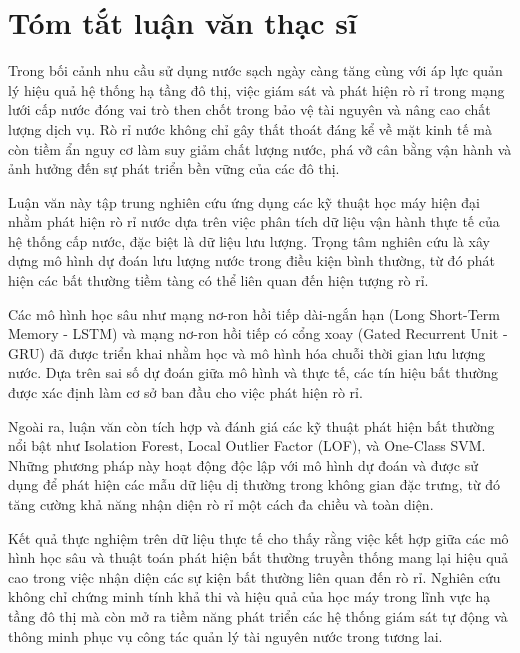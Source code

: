 \chapter*{Tóm tắt luận văn thạc sĩ}

Trong bối cảnh nhu cầu sử dụng nước sạch ngày càng tăng cùng với áp lực quản lý hiệu quả hệ thống hạ tầng đô thị, việc giám sát và phát hiện rò rỉ trong mạng lưới cấp nước đóng vai trò then chốt trong bảo vệ tài nguyên và nâng cao chất lượng dịch vụ. Rò rỉ nước không chỉ gây thất thoát đáng kể về mặt kinh tế mà còn tiềm ẩn nguy cơ làm suy giảm chất lượng nước, phá vỡ cân bằng vận hành và ảnh hưởng đến sự phát triển bền vững của các đô thị.

Luận văn này tập trung nghiên cứu ứng dụng các kỹ thuật học máy hiện đại nhằm phát hiện rò rỉ nước dựa trên việc phân tích dữ liệu vận hành thực tế của hệ thống cấp nước, đặc biệt là dữ liệu lưu lượng. Trọng tâm nghiên cứu là xây dựng mô hình dự đoán lưu lượng nước trong điều kiện bình thường, từ đó phát hiện các bất thường tiềm tàng có thể liên quan đến hiện tượng rò rỉ.

Các mô hình học sâu như mạng nơ-ron hồi tiếp dài-ngắn hạn (Long Short-Term Memory - LSTM) và mạng nơ-ron hồi tiếp có cổng xoay (Gated Recurrent Unit - GRU) đã được triển khai nhằm học và mô hình hóa chuỗi thời gian lưu lượng nước. Dựa trên sai số dự đoán giữa mô hình và thực tế, các tín hiệu bất thường được xác định làm cơ sở ban đầu cho việc phát hiện rò rỉ.

Ngoài ra, luận văn còn tích hợp và đánh giá các kỹ thuật phát hiện bất thường nổi bật như Isolation Forest, Local Outlier Factor (LOF), và One-Class SVM. Những phương pháp này hoạt động độc lập với mô hình dự đoán và được sử dụng để phát hiện các mẫu dữ liệu dị thường trong không gian đặc trưng, từ đó tăng cường khả năng nhận diện rò rỉ một cách đa chiều và toàn diện.

Kết quả thực nghiệm trên dữ liệu thực tế cho thấy rằng việc kết hợp giữa các mô hình học sâu và thuật toán phát hiện bất thường truyền thống mang lại hiệu quả cao trong việc nhận diện các sự kiện bất thường liên quan đến rò rỉ. Nghiên cứu không chỉ chứng minh tính khả thi và hiệu quả của học máy trong lĩnh vực hạ tầng đô thị mà còn mở ra tiềm năng phát triển các hệ thống giám sát tự động và thông minh phục vụ công tác quản lý tài nguyên nước trong tương lai.
